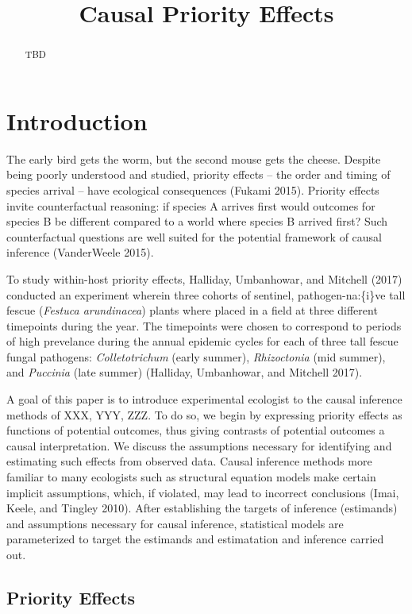 \documentclass[]{article}
\title{Causal Priority Effects}
\author{}
\date{}
\begin{document}
\maketitle
\begin{abstract}
TBD
\end{abstract}

\hypertarget{introduction}{%
\section{Introduction}\label{introduction}}

The early bird gets the worm, but the second mouse gets the cheese.
Despite being poorly understood and studied, priority effects -- the
order and timing of species arrival -- have ecological consequences
(Fukami 2015). Priority effects invite counterfactual reasoning: if
species A arrives first would outcomes for species B be different
compared to a world where species B arrived first? Such counterfactual
questions are well suited for the potential framework of causal
inference (VanderWeele 2015).

To study within-host priority effects, Halliday, Umbanhowar, and
Mitchell (2017) conducted an experiment wherein three cohorts of
sentinel, pathogen-na:\{i\}ve tall fescue (\emph{Festuca arundinacea})
plants where placed in a field at three different timepoints during the
year. The timepoints were chosen to correspond to periods of high
prevelance during the annual epidemic cycles for each of three tall
fescue fungal pathogens: \emph{Colletotrichum} (early summer),
\emph{Rhizoctonia} (mid summer), and \emph{Puccinia} (late summer)
(Halliday, Umbanhowar, and Mitchell 2017).

A goal of this paper is to introduce experimental ecologist to the
causal inference methods of XXX, YYY, ZZZ. To do so, we begin by
expressing priority effects as functions of potential outcomes, thus
giving contrasts of potential outcomes a causal interpretation. We
discuss the assumptions necessary for identifying and estimating such
effects from observed data. Causal inference methods more familiar to
many ecologists such as structural equation models make certain implicit
assumptions, which, if violated, may lead to incorrect conclusions
(Imai, Keele, and Tingley 2010). After establishing the targets of
inference (estimands) and assumptions necessary for causal inference,
statistical models are parameterized to target the estimands and
estimatation and inference carried out.

\hypertarget{priority-effects}{%
\subsection{Priority Effects}\label{priority-effects}}
\end{document}
